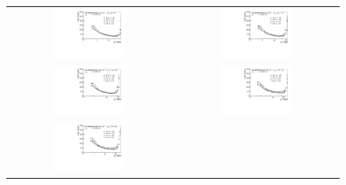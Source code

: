 \begin{figure}
\centering
\begin{tabular}{cc}
\includegraphics[width=0.45\textwidth]{figures/main/corrections/fake_rates/FakesEta_pp_5p02_r003_Tight_mcprob0p3_JZ2_jetpt_2.pdf} &
\includegraphics[width=0.45\textwidth]{figures/main/corrections/fake_rates/FakesEta_pp_5p02_r003_Tight_mcprob0p3_JZ2_jetpt_3.pdf} \\
\includegraphics[width=0.45\textwidth]{figures/main/corrections/fake_rates/FakesEta_pp_5p02_r003_Tight_mcprob0p3_JZ2_jetpt_4.pdf} &
\includegraphics[width=0.45\textwidth]{figures/main/corrections/fake_rates/FakesEta_pp_5p02_r003_Tight_mcprob0p3_JZ3_jetpt_5.pdf} \\
\includegraphics[width=0.45\textwidth]{figures/main/corrections/fake_rates/FakesEta_pp_5p02_r003_Tight_mcprob0p3_JZ3_jetpt_6.pdf} &

\end{tabular}
\end{figure}
